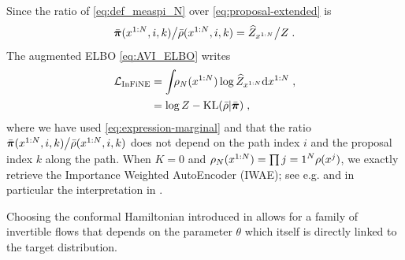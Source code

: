\documentclass{article}
\begin{document}

Since the ratio of \eqref{eq:def_measpi_N} over \eqref{eq:proposal-extended} is
\begin{equation}
\label{eq:ratio-extended}
{\bar{\boldsymbol{\pi}}(x^{1:N},i,k)}\big/{\bar{\rho}(x^{1:N},i,k)}= {\widehat{Z}_{x^{1:N}}}\big/{Z} \;.
\end{equation}
The augmented ELBO   \eqref{eq:AVI_ELBO} writes
\begin{align}
 \label{eq:infine_elbo-alt}
\mathcal{L}_{\operatorname{InFiNE}} &= \int_{} \rho_N( x^{1:N})   \log \widehat{Z}_{x^{1:N}} \mathrm{d} x^{1:N}\;,\\
\nonumber
 &=  \log Z - \operatorname{KL}( \bar{\rho} | \bar{\boldsymbol{\pi}} )\;,
\end{align}
where we have used \eqref{eq:expression-marginal} and that the ratio ${\bar{\boldsymbol{\pi}}(x^{1:N},i,k)}\big/{\bar{\rho}(x^{1:N},i,k)}$ does not depend on 
the path index $i$ and the proposal index $k$ along the path. When $K=0$ and $\rho_N(x^{1:N})= \prod{j=1}^N \rho(x^j)$, we exactly retrieve the Importance Weighted AutoEncoder (IWAE); see e.g.  \cite{burda:grosse:2015} and in particular the interpretation in \cite{cremer2017reinterpreting}. 

Choosing the conformal Hamiltonian introduced in  allows for a family of invertible flows that depends on the parameter $\theta$ which itself is directly linked to the target distribution.
\end{document}
